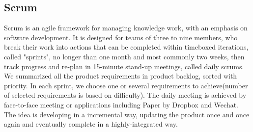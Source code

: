 \documentclass[a4paper,11pt]{article}
\begin{document}
\subsection{Scrum}
Scrum is an agile framework for managing knowledge work, with an emphasis on software development. It is designed for teams of three to nine members, who break their work into actions that can be completed within timeboxed iterations, called "sprints", no longer than one month and most commonly two weeks, then track progress and re-plan in 15-minute stand-up meetings, called daily scrums. 
We summarized all the product requirements in product backlog, sorted with priority. In each sprint, we choose one or several requirements to achieve(number of selected requirements is based on difficulty). The daily meeting is achieved by face-to-face meeting or applications including Paper by Dropbox and Wechat.
The idea is developing in a incremental way, updating the product once and once again and eventually complete in a highly-integrated way.
\end{document}
